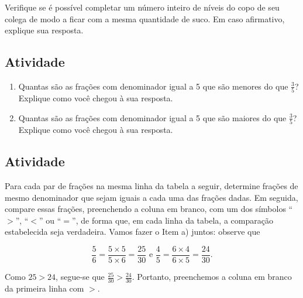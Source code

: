 Verifique se é possível completar um número inteiro de níveis do copo de seu colega de modo a ficar com a mesma quantidade de suco. Em caso afirmativo, explique sua resposta.

\subsection{Atividade}

\begin{enumerate} [\quad a)] %
  \item     Quantas são as frações com denominador igual a 5 que são menores do que $\frac{3}{5}$? Explique como você chegou à sua resposta.
  \item     Quantas são as frações com denominador igual a 5 que são maiores do que $\frac{3}{5}$? Explique como você chegou à sua resposta.
\end{enumerate} %

\vspace*{-.5cm}

\subsection{Atividade}

Para cada par de frações na mesma linha da tabela a seguir, determine frações de mesmo denominador que sejam iguais a cada uma das frações dadas. Em seguida, compare essas frações, preenchendo a coluna em branco, com um dos símbolos ``$>$'', ``$<$'' ou ``$=$'', de forma que, em cada linha da tabela, a comparação estabelecida seja verdadeira. Vamos fazer o Item a) juntos: observe que

$$\frac{5}{6} = \frac{5 \times 5}{5 \times 6} = \frac{25}{30} \text{ e } \frac{4}{5} = \frac{6 \times 4}{6 \times 5} = \frac{24}{30}.$$

Como $25 > 24$, segue-se que $\frac{25}{30} > \frac{24}{30}$. Portanto, preenchemos a coluna em branco da primeira linha com $>$.



